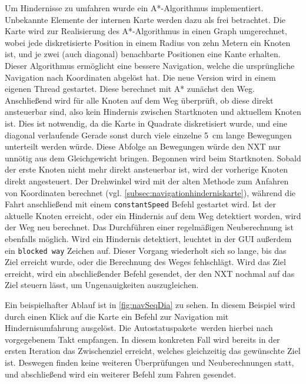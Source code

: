 \documentclass[oneside,abstractoff,a4paper]{scrartcl}
\begin{document}
Um Hindernisse zu umfahren wurde ein A*-Algorithmus implementiert.
Unbekannte Elemente der internen Karte werden dazu als frei betrachtet. Die Karte wird zur Realisierung des A*-Algorithmus in einen Graph umgerechnet, wobei jede diskretisierte Position %
in einem Radius von zehn Metern ein Knoten ist, und je zwei (auch diagonal) benachbarte Positionen eine Kante erhalten. %
Dieser Algorithmus ermöglicht eine bessere Navigation, welche die ursprüngliche Navigation nach Koordinaten abgelöst hat. Die neue Version %
wird in einem eigenen Thread gestartet. Diese berechnet mit A* zunächst den Weg. Anschließend wird für alle Knoten auf dem Weg überprüft, ob diese direkt ansteuerbar sind, also kein Hindernis zwischen Startknoten und aktuellem Knoten ist. Dies ist notwendig, da die Karte in Quadrate diskretisiert wurde, und eine diagonal verlaufende Gerade sonst durch viele einzelne \SI{5}{\centi\meter} lange Bewegungen unterteilt werden würde. Diese Abfolge an Bewegungen würde den NXT nur unnötig aus dem Gleichgewicht bringen.%
Begonnen wird beim Startknoten.%
Sobald der erste Knoten nicht mehr direkt ansteuerbar ist, wird der vorherige Knoten direkt angesteuert. Der Drehwinkel wird mit der alten Methode zum Anfahren von Koordinaten berechnet (vgl. \cref{subsec:navigationhinderniskarte}),%
während die Fahrt anschließend mit einem \texttt{constantSpeed} Befehl gestartet wird. Ist der aktuelle Knoten erreicht, oder ein Hindernis auf dem Weg detektiert worden, wird der Weg neu berechnet. Das Durchführen einer regelmäßigen Neuberechnung ist ebenfalls möglich.
Wird ein Hindernis detektiert, leuchtet in der GUI außerdem ein \texttt{blocked way} Zeichen auf. Dieser Vorgang wiederholt sich so lange, bis das Ziel erreicht wurde, oder die Berechnung des Weges fehlschlägt. Wird das Ziel erreicht, wird ein abschließender Befehl gesendet, der den NXT nochmal auf das Ziel steuern lässt, um Ungenauigkeiten auszugleichen.


Ein beispielhafter Ablauf ist in \cref{fig:navSeqDia} zu sehen. In diesem Beispiel wird durch einen Klick auf die Karte ein Befehl zur Navigation mit Hindernisumfahrung ausgelöst. Die \glqq Autostatuspakete\grqq\ werden hierbei nach vorgegebenem Takt empfangen. In diesem konkreten Fall wird bereits in der ersten Iteration das Zwischenziel erreicht, welches gleichzeitig das gewünschte Ziel ist. Deswegen finden keine weiteren Überprüfungen und Neuberechnungen statt, und abschließend wird ein weiterer Befehl zum Fahren gesendet. %
\end{document}
